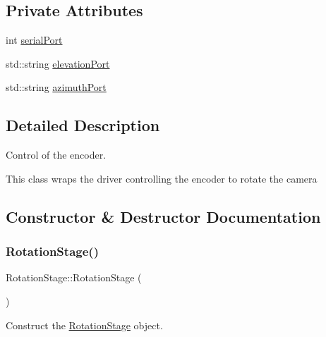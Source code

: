 \subsection*{Private Attributes}
\begin{DoxyCompactItemize}
\item 
int \hyperlink{class_rotation_stage_a3c76fa916da6c1804f62d61e9092ec1c}{serial\+Port}
\item 
std\+::string \hyperlink{class_rotation_stage_a7e9ded06868713a22c1f630ce14c8f4e}{elevation\+Port}
\item 
std\+::string \hyperlink{class_rotation_stage_a50832a485e32836d10c4ebc2846fc93f}{azimuth\+Port}
\end{DoxyCompactItemize}


\subsection{Detailed Description}
Control of the encoder. 

This class wraps the driver controlling the encoder to rotate the camera 

\subsection{Constructor \& Destructor Documentation}
\mbox{\label{class_rotation_stage_a14ae00fd0137138b8fa3c653498d13e9}} 
\subsubsection{\texorpdfstring{Rotation\+Stage()}{RotationStage()}}
{\footnotesize\ttfamily Rotation\+Stage\+::\+Rotation\+Stage (\begin{DoxyParamCaption}{ }\end{DoxyParamCaption})\hspace{0.3cm}{\ttfamily [inline]}}



Construct the \hyperlink{class_rotation_stage}{Rotation\+Stage} object. 

\mbox{\label{class_rotation_stage_a3023bae2d8de9f084036de453d8ac374}} 
